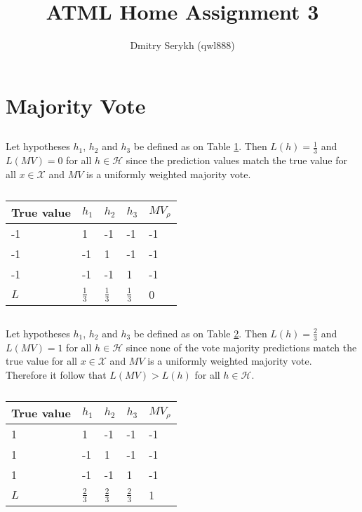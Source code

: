 \documentclass[a4paper]{article}
\title{\vspace{-5cm}ATML Home Assignment 3}
\author{Dmitry Serykh (qwl888)}
\begin{document}
\maketitle
\section{Majority Vote}
\label{sec:1}
\subsection{}
\label{subsec:11}
Let hypotheses $h_1$, $h_2$ and $h_3$ be defined as on Table \ref{tab:1}. Then
$L(h)=\frac{1}{3}$ and $L(MV) = 0$ for all $h \in \mathcal{H}$  since the
prediction values match the true value for all $x \in \mathcal{X}$ and
$MV$ is a uniformly weighted majority vote.\\

\begin{table}[H]
\centering
\begin{tabular}{|l|l|l|l|l|}
\hline
True value & $h_1$ & $h_2$ & $h_3$ & $MV_{\rho}$ \\ \hline
-1 & 1 & -1 & -1 & -1 \\ \hline
-1 & -1 & 1 & -1 & -1 \\ \hline
-1 & -1 & -1 & 1 & -1 \\ \hline
$L$ & $\frac{1}{3}$ & $\frac{1}{3}$ & $\frac{1}{3}$ & 0 \\ \hline
\end{tabular}
\caption{}
\label{tab:1}
\end{table}

\subsection{}
\label{subsec:22}
Let hypotheses $h_1$, $h_2$ and $h_3$ be defined as on Table \ref{tab:2}. Then
$L(h)=\frac{2}{3}$ and $L(MV) = 1$ for all $h \in \mathcal{H}$  since none of the
vote majority predictions match the true value for all $x \in \mathcal{X}$ and
$MV$ is a uniformly weighted majority vote.\\
Therefore it follow that $L(MV) > L(h)$ for all $h\in \mathcal{H}$.
\begin{table}[H]
\centering
\begin{tabular}{|l|l|l|l|l|}
\hline
True value & $h_1$ & $h_2$ & $h_3$ & $MV_{\rho}$ \\ \hline
1 & 1 & -1 & -1 & -1 \\ \hline
1 & -1 & 1 & -1 & -1 \\ \hline
1 & -1 & -1 & 1 & -1 \\ \hline
$L$ & $\frac{2}{3}$ & $\frac{2}{3}$ & $\frac{2}{3}$ & 1 \\ \hline
\end{tabular}
\caption{}
\label{tab:2}
\end{table}
\end{document}

